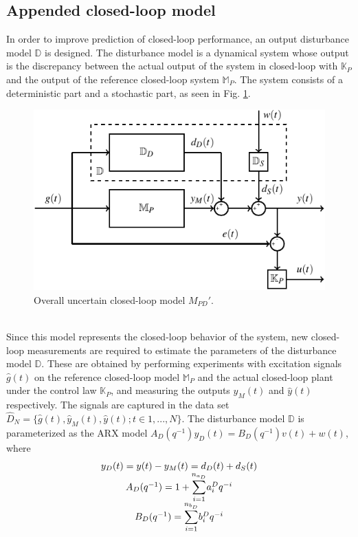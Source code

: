 \documentclass[letterpaper, 10 pt, conference]{ieeeconf}  %
\begin{document}
	\subsection{Appended closed-loop model}
	In order to improve prediction of closed-loop performance, an output disturbance model $\mathbb{D}$ is designed. The disturbance model is a dynamical system whose output is the discrepancy between the actual output of the system in closed-loop with  $\mathbb{K}_P$ and the output of the reference closed-loop system $\mathbb{M}_P$. The system consists of a deterministic part and a stochastic part, as seen in Fig. \ref{Appended}.
	\begin{figure}[h!]
		\hspace{20pt}
		\includegraphics[scale = 0.7]{Mp-D-E.pdf}
		\caption{Overall uncertain closed-loop model $M_{PD}'$.}
		\label{Appended}
	\end{figure}
	\vspace{-5pt} \\
	Since this model represents the closed-loop behavior of the system, new closed-loop measurements are required to estimate the parameters of the disturbance model $\mathbb{D}$. These are obtained by performing experiments with excitation signals $\hat{g}(t)$ on the reference closed-loop model $\mathbb{M}_P$ and the actual closed-loop plant under the control law $\mathbb{K}_P$, and measuring the outputs $\hat{y}_M(t)$ and $\hat{y}(t)$ respectively. The signals are captured in the data set $\hat{D}_{N}=\{\hat{g}(t),\hat{y}_M(t),\hat{y}(t);t\in{1,...,N}\}$.
	The disturbance model $\mathbb{D}$ is parameterized as the ARX model $A_D(q^{-1})y_D(t) = B_D(q^{-1})v(t)+w(t)$, where 
	\begin{equation*}
	\begin{matrix}
	y_D(t) = y(t) - y_M(t) = d_D(t)+d_S(t) \\ 
	A_D(q^{-1}) = 1+\mathlarger{\sum\limits_{i=1}^{n_{a_D}}}a_i^Dq^{-i}\\
	B_D(q^{-1}) = \mathlarger{\sum\limits_{i=1}^{n_{b_D}}}b_i^Dq^{-i}
	\end{matrix}  
	\end{equation*}
\end{document}
